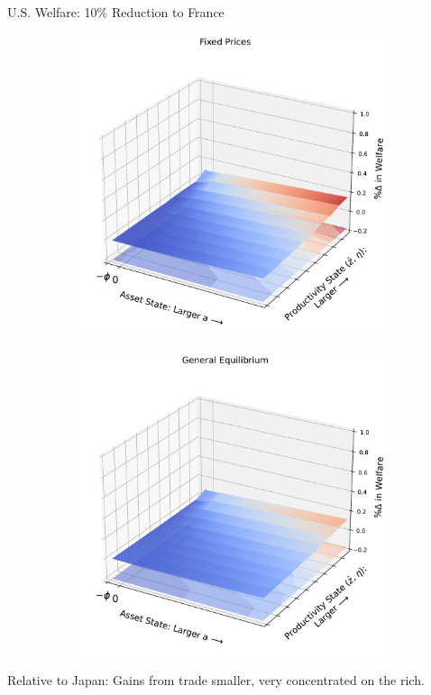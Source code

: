 \documentclass[9pt,pdftex,aspectratio=1610]{beamer}
\theoremstyle{definition}
\begin{document}
\begin{frame}[t]{U.S. Welfare: 10\% Reduction to France }
\begin{figure}[!t]
\begin{subfigure}{}
    \includegraphics[scale = 0.35]{../notes/figures/welfare-france-fix-p.pdf}
\end{subfigure}
\begin{subfigure}{}
    \includegraphics[scale = 0.35]{../notes/figures/welfare-france-ge.pdf}
\end{subfigure}
\end{figure}
\bigskip
Relative to Japan: Gains from trade smaller, very concentrated on the rich.
\end{frame}
\end{document}
